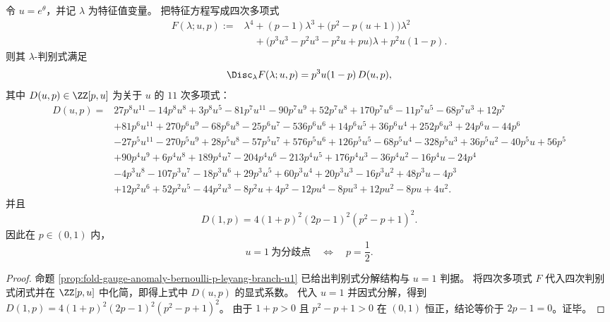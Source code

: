 \begin{theorem}[压力分歧判别式的全分解与 \(u=1\) 临界并合条件]\label{thm:fold-bernoulli-p-pressure-discriminant-degree11}
令 \(u=e^\theta\)，并记 \(\lambda\) 为特征值变量。
把特征方程写成四次多项式
\[
\begin{aligned}
F(\lambda;u,p):={}&\lambda^{4}+(p-1)\lambda^{3}
+\bigl(p^{2}-p(u+1)\bigr)\lambda^{2}\\
&\quad+\bigl(p^{3}u^{3}-p^{2}u^{3}-p^{2}u+pu\bigr)\lambda
+p^{2}u(1-p).
\end{aligned}
\]
则其 \(\lambda\)-判别式满足
\[
\Disc_{\lambda}F(\lambda;u,p)=p^{3}u(1-p)\,D(u,p),
\]
其中 \(D(u,p)\in\ZZ[p,u]\) 为关于 \(u\) 的 \(11\) 次多项式：
\[
\begin{aligned}
D(u,p)={}&27p^{8}u^{11}-14p^{8}u^{8}+3p^{8}u^{5}-81p^{7}u^{11}-90p^{7}u^{9}+52p^{7}u^{8}
+170p^{7}u^{6}-11p^{7}u^{5}-68p^{7}u^{3}+12p^{7}\\
&+81p^{6}u^{11}+270p^{6}u^{9}-68p^{6}u^{8}-25p^{6}u^{7}-536p^{6}u^{6}
+14p^{6}u^{5}+36p^{6}u^{4}+252p^{6}u^{3}+24p^{6}u-44p^{6}\\
&-27p^{5}u^{11}-270p^{5}u^{9}+28p^{5}u^{8}-57p^{5}u^{7}+576p^{5}u^{6}
+126p^{5}u^{5}-68p^{5}u^{4}-328p^{5}u^{3}+36p^{5}u^{2}-40p^{5}u+56p^{5}\\
&+90p^{4}u^{9}+6p^{4}u^{8}+189p^{4}u^{7}-204p^{4}u^{6}-213p^{4}u^{5}
+176p^{4}u^{3}-36p^{4}u^{2}-16p^{4}u-24p^{4}\\
&-4p^{3}u^{8}-107p^{3}u^{7}-18p^{3}u^{6}+29p^{3}u^{5}+60p^{3}u^{4}
+20p^{3}u^{3}-16p^{3}u^{2}+48p^{3}u-4p^{3}\\
&+12p^{2}u^{6}+52p^{2}u^{5}-44p^{2}u^{3}-8p^{2}u+4p^{2}
-12pu^{4}-8pu^{3}+12pu^{2}-8pu+4u^{2}.
\end{aligned}
\]
并且
\[
D(1,p)=4(1+p)^2(2p-1)^2(p^2-p+1)^2.
\]
因此在 \(p\in(0,1)\) 内，
\[
u=1\ \text{为分歧点}
\quad\Longleftrightarrow\quad
p=\frac12.
\]
\end{theorem}
\begin{proof}
命题 \ref{prop:fold-gauge-anomaly-bernoulli-p-leyang-branch-u1}
已给出判别式分解结构与 \(u=1\) 判据。
将四次多项式 \(F\) 代入四次判别式闭式并在 \(\ZZ[p,u]\) 中化简，即得上式中 \(D(u,p)\) 的显式系数。
代入 \(u=1\) 并因式分解，得到
\(
D(1,p)=4(1+p)^2(2p-1)^2(p^2-p+1)^2
\)。
由于 \(1+p>0\) 且 \(p^2-p+1>0\) 在 \((0,1)\) 恒正，结论等价于 \(2p-1=0\)。证毕。
\end{proof}

